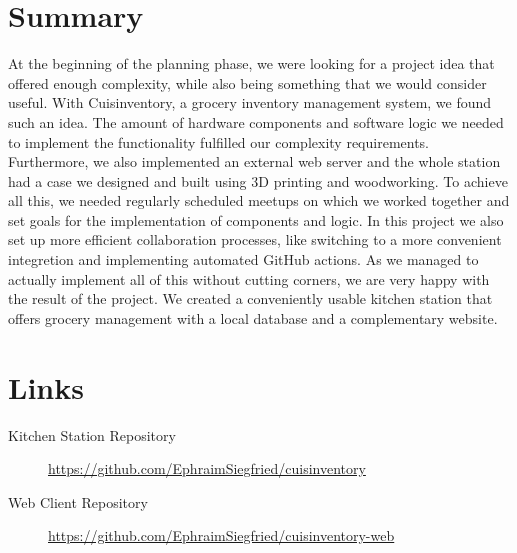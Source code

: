 \documentclass{article}
\begin{document}
\section{Summary}
At the beginning of the planning phase, we were looking for a project idea that offered enough complexity, while also being something that we would consider useful.
With Cuisinventory, a grocery inventory management system, we found such an idea. The amount of hardware components and software logic we needed to implement the functionality fulfilled our complexity requirements.
Furthermore, we also implemented an external web server and the whole station had a case we designed and built using 3D printing and woodworking.
To achieve all this, we needed regularly scheduled meetups on which we worked together and set goals for the implementation of components and logic.
In this project we also set up more efficient collaboration processes, like switching to a more convenient integretion  and implementing automated GitHub actions.
As we managed to actually implement all of this without cutting corners, we are very happy with the result of the project.
We created a conveniently usable kitchen station that offers grocery management with a local database and a complementary website.

\section{Links}

\begin{description}
	\item [Kitchen Station Repository]\url{https://github.com/EphraimSiegfried/cuisinventory}
	\item[Web Client Repository] \url{https://github.com/EphraimSiegfried/cuisinventory-web}
\end{description}
\end{document}
